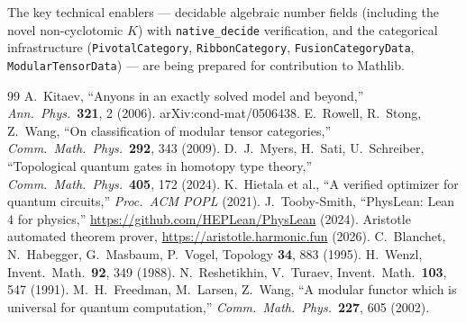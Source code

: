 \documentclass[12pt]{article}
\newcommand{\lean}[1]{\texttt{#1}}
\newcommand{\nativedecide}{\texttt{native\_decide}}
\begin{document}
The key technical enablers --- decidable algebraic number fields
(including the novel non-cyclotomic $K$) with \nativedecide{}
verification, and the categorical infrastructure
(\lean{PivotalCategory}, \lean{RibbonCategory},
\lean{FusionCategoryData}, \lean{ModularTensorData}) --- are being
prepared for contribution to Mathlib.

\begin{thebibliography}{99}
 A.~Kitaev, ``Anyons in an exactly solved model and beyond,'' \emph{Ann.\ Phys.}\ \textbf{321}, 2 (2006). arXiv:cond-mat/0506438.
 E.~Rowell, R.~Stong, Z.~Wang, ``On classification of modular tensor categories,'' \emph{Comm.\ Math.\ Phys.}\ \textbf{292}, 343 (2009).
 D.~J.~Myers, H.~Sati, U.~Schreiber, ``Topological quantum gates in homotopy type theory,'' \emph{Comm.\ Math.\ Phys.}\ \textbf{405}, 172 (2024).
 K.~Hietala et al., ``A verified optimizer for quantum circuits,'' \emph{Proc.\ ACM POPL} (2021).
 J.~Tooby-Smith, ``PhysLean: Lean 4 for physics,'' \url{https://github.com/HEPLean/PhysLean} (2024).
 Aristotle automated theorem prover, \url{https://aristotle.harmonic.fun} (2026).
 C.~Blanchet, N.~Habegger, G.~Masbaum, P.~Vogel, Topology \textbf{34}, 883 (1995).
 H.~Wenzl, Invent.\ Math.\ \textbf{92}, 349 (1988).
 N.~Reshetikhin, V.~Turaev, Invent.\ Math.\ \textbf{103}, 547 (1991).
 M.~H.~Freedman, M.~Larsen, Z.~Wang, ``A modular functor which is universal for quantum computation,'' \emph{Comm.\ Math.\ Phys.}\ \textbf{227}, 605 (2002).
\end{thebibliography}
\end{document}
